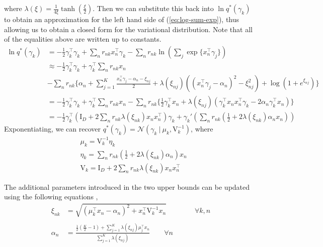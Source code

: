 \documentclass[twoside,11pt]{article}
\newcommand{\tr}{\intercal}
\newcommand{\eye}{\mathrm{I}}
\newcommand\given[1][]{\:#1\vert\:}
\begin{document}
where $\lambda(\xi) = \frac{1}{4\xi} \tanh \left( \frac{\xi}{2} \right)$. Then we can substitute this back into $\ln q^{*}(\gamma_k)$ to obtain an approximation for the left hand side of (\ref{eq:log-sum-exp}), thus allowing us to obtain a closed form for the variational distribution. Note that all of the equalities above are written up to constants.
\begin{align*}
    \ln q^{*}(\gamma_k) &= - \frac{1}{2} \gamma_k^{\tr} \gamma_k + \sum_{n} r_{nk} x_n^{\intercal} \gamma_k  - \sum_n r_{nk} \ln \left( \sum_j \exp\{x_n^{\intercal} \gamma_j \} \right)  \\
    & \approx - \frac{1}{2} \gamma_k^{\tr} \gamma_k + \gamma_k^{\intercal} \sum_{n} r_{nk} x_n \\
    & - \sum_n r_{nk} \Bigg\{ \alpha_n + \sum_{j = 1}^K \frac{x_n^{\intercal} \gamma_j - \alpha_n - \xi_{nj}}{2} + \lambda(\xi_{nj}) \left( (x_n^{\intercal} \gamma_j - \alpha_n)^2 - \xi_{nj}^2\right) + \log \left( 1 + e^{\xi_{nj}}\right) \Bigg\} \\
    & = - \frac{1}{2} \gamma_k^{\tr} \gamma_k + \gamma_k^{\intercal} \sum_{n} r_{nk} x_n - \sum_n r_{nk} \Bigg\{ \frac{1}{2} \gamma_k^{\tr} x_n + \lambda\left( \xi_{nj} \right) \left( \gamma_k^{\tr}x_n x_n^{\tr} \gamma_k - 2\alpha_n \gamma_k^{\tr} x_n \right)\Bigg\} \\
    &= -\frac{1}{2} \gamma_k^{\tr} \left(\eye_D  + 2 \sum_n r_{nk} \lambda(\xi_{nk}) x_n x_n^{\tr} \right) \gamma_k + \gamma_k' \left( \sum_n r_{nk} \left(\frac{1}{2} + 2 \lambda \left( \xi_{nk}\right) \alpha_n  x_n\right) \right)
\end{align*}
Exponentiating, we can recover $q^{*}(\gamma_k) = \mathcal{N} \left(\gamma_k \given \mu_k, \mathrm{V}_k^{-1} \right)$, where
\begin{equation} \label{eq:gamma_params}
\begin{split}
	& \mu_k = \mathrm{V}_k^{-1} \eta_k \\
	& \eta_k = \sum_{n} r_{nk} \left( \frac{1}{2} + 2 \lambda(\xi_{nk}) \alpha_n \right) x_n \\
	& \mathrm{V}_k = \eye_D + 2 \sum_{n} r_{nk} \lambda(\xi_{nk}) x_n x_n^{\tr}
\end{split}
\end{equation}

The additional parameters introduced in the two upper bounds can be updated using the following equations \parencite{Depraetere:17},
\begin{align*}
    \xi_{nk} & = \sqrt{\left(\mu_k^{\intercal}x_n - \alpha_n \right)^2 + x_n^{\intercal} \mathrm{V}_k^{-1} x_n} \qquad \qquad \forall k, n \\ \\
    \alpha_n & = \frac{\frac{1}{2}\left( \frac{K}{2} - 1\right) + \sum_{j = 1}^K \lambda \left( \xi_{nj} \right)\mu_j^{\intercal} x_n}{\sum_{j=1}^{K} \lambda \left( \xi_{nj}\right)} \qquad \forall n
\end{align*}
\end{document}
